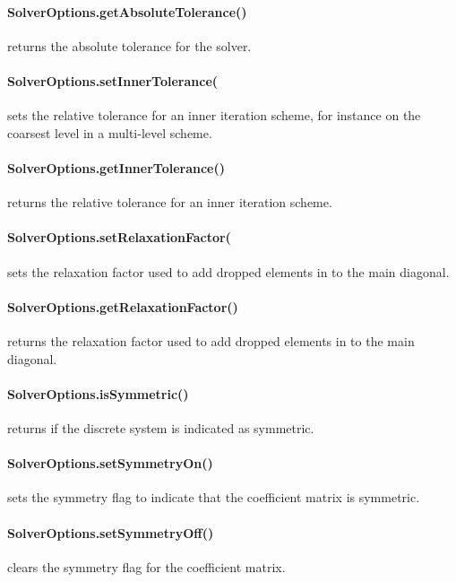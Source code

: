 \paragraph{SolverOptions.getAbsoluteTolerance()}
returns the absolute tolerance for the solver.


\paragraph{SolverOptions.setInnerTolerance(
}
sets the relative tolerance for an inner iteration scheme, for instance
on the coarsest level in a multi-level scheme.


\paragraph{SolverOptions.getInnerTolerance()}
returns the relative tolerance for an inner iteration scheme.


\paragraph{SolverOptions.setRelaxationFactor(
}
sets the relaxation factor used to add dropped elements in \RILU to the main diagonal.


\paragraph{SolverOptions.getRelaxationFactor()}
returns the relaxation factor used to add dropped elements in \RILU to the main diagonal.


\paragraph{SolverOptions.isSymmetric()}
returns \True if the discrete system is indicated as symmetric.


\paragraph{SolverOptions.setSymmetryOn()}
sets the symmetry flag to indicate that the coefficient matrix is symmetric.


\paragraph{SolverOptions.setSymmetryOff()}
clears the symmetry flag for the coefficient matrix.


